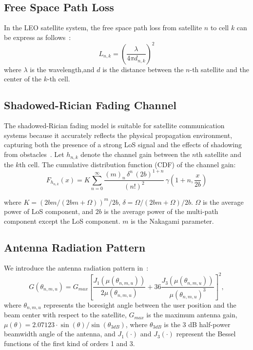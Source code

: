 \subsection{Free Space Path Loss}

In the LEO satellite system, the free space path loss from satellite $n$ to cell $k$ can be express as follows~\cite{Satellite-Multi-Beam}:
\begin{equation}
    L_{n,k} = \left(\frac{\lambda}{4\pi d_{n,k}}\right)^2
\end{equation}
where $\lambda$ is the wavelength,and $d$ is the distance between the $n$-th satellite and the center of the $k$-th cell.

\subsection{Shadowed-Rician Fading Channel}

The shadowed-Rician fading model is suitable for satellite communication systems because it accurately reflects the physical propagation environment, capturing both the presence of a strong LoS signal and the effects of shadowing from obstacles~\cite{channel-model}. Let $h_{n,k}$ denote the channel gain between the $n$th satellite and the $k$th cell. The cumulative distribution function (CDF) of the channel gain:
\begin{equation}
F_{h_{n,k}}(x) = K \sum_{n=0}^{\infty} \frac{(m)_n \, \delta^n \, (2b)^{1+n}}{(n!)^2} \, \gamma\left(1+n, \frac{x}{2b}\right)
\end{equation}

where $K = (2bm/(2bm+\Omega))^m/2b$, $\delta = \Omega/(2bm+\Omega)/2b$. $\Omega$ is the average power of LoS component, and $2b$ is the average power of the multi-path component except the LoS component. $m$ is the Nakagami parameter.

\subsection{Antenna Radiation Pattern}
We introduce the antenna radiation pattern in~\cite{Energy-Efficient}:
\begin{equation}
G(\theta_{n,m,u}) = G_{max} \left[ \frac{J_1\left(\mu(\theta_{n,m,u})\right)}{2\mu(\theta_{n,m,u})} 
+ 36 \frac{J_3\left(\mu(\theta_{n,m,u})\right)}{\mu(\theta_{n,m,u})^3} \right]^2,
\end{equation}
where $\theta_{n,m,u}$ represents the boresight angle between the user position and the beam center with respect to the satellite, $G_{max}$ is the maximum antenna gain, $\mu(\theta) = 2.07123\cdot \sin(\theta)/\sin(\theta_{3dB})$, 
where $\theta_{3dB}$ is the 3 dB half-power beamwidth angle of the antenna, and $J_1(\cdot)$ and $J_3(\cdot)$ represent the Bessel functions of the first kind of orders 1 and 3.


